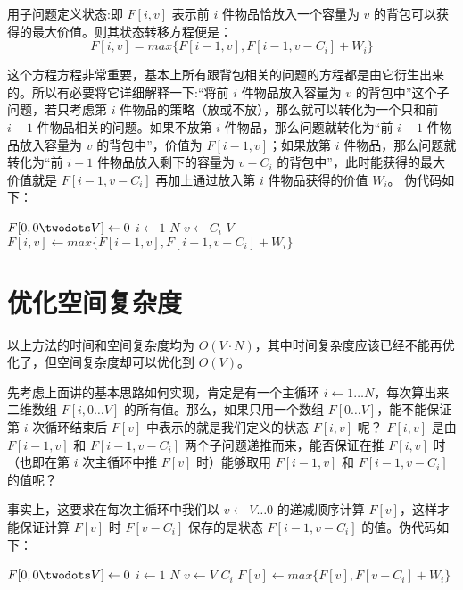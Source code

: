 \documentclass[cn, 11pt, chinese, toc=twocol]{elegantbook}
\begin{document}
用子问题定义状态:即 $F[i, v]$ 表示前 $i$ 件物品恰放入一个容量为 $v$ 的背包可以获得的最大价值。则其状态转移方程便是：
\begin{equation}
  F[i, v] = max\{F[i-1, v], F[i-1,v-C_i] + W_i \}
\end{equation}

这个方程方程非常重要，基本上所有跟背包相关的问题的方程都是由它衍生出来的。所以有必要将它详细解释一下:“将前 $i$ 件物品放入容量为 $v$ 的背包中”这个子问题，若只考虑第 $i$ 件物品的策略（放或不放），那么就可以转化为一个只和前 $i-1$ 件物品相关的问题。如果不放第 $i$ 件物品，那么问题就转化为“前 $i-1$ 件物品放入容量为 $v$ 的背包中”，价值为 $F[i-1, v]$；如果放第 $i$ 件物品，那么问题就转化为“前 $i-1$ 件物品放入剩下的容量为 $v-C_i$ 的背包中”，此时能获得的最大价值就是 $F[i-1, v-C_i]$
再加上通过放入第 $i$ 件物品获得的价值 $W_i$。
伪代码如下：
\begin{codebox}
    \li $F[0, 0 \twodots V] \leftarrow 0$ 
    \li \For $i \gets 1$ \To $N$        
    \Do
    \li \For $v \gets C_i$ \To $V$
        \Do
     \li  $F[i,v] \gets max\{F[i-1, v], F[i-1,v-C_i] + W_i \}$
        \End
    \End
\end{codebox}

\section{优化空间复杂度}

以上方法的时间和空间复杂度均为 $O(V \cdot N)$，其中时间复杂度应该已经不能再优化了，但空间复杂度却可以优化到 $O(V)$。

先考虑上面讲的基本思路如何实现，肯定是有一个主循环 $i \leftarrow 1\dots N$，每次算出来二维数组 $F[i, 0\dots V]$ 的所有值。那么，如果只用一个数组 $F[0\dots V]$，能不能保证第 $i$ 次循环结束后 $F[v]$ 中表示的就是我们定义的状态 $F[i, v]$ 呢？ $F[i,v ]$ 是由 $F[i-1, v]$ 和 $F[i-1, v-C_i]$ 两个子问题递推而来，能否保证在推 $F[i, v]$ 时（也即在第 $i$ 次主循环中推 $F[v]$ 时）能够取用 $F[i-1, v]$ 和 $F[i-1, v-C_i]$ 的值呢？

事实上，这要求在每次主循环中我们以 $v \leftarrow V \dots 0$  的递减顺序计算 $F[v]$，这样才能保证计算 $F[v]$ 时 $F[v-C_i]$ 保存的是状态 $F[i-1, v-C_i]$ 的值。伪代码如下：

\begin{codebox}
    \li $F[0, 0 \twodots V] \leftarrow 0$ 
    \li \For $i \gets 1$ \To $N$        
    \Do
    \li \For $v \gets V$ \To $C_i$
        \Do
     \li  $F[v] \gets max\{F[v], F[v-C_i] + W_i \}$
        \End
    \End
\end{codebox}
\end{document}
